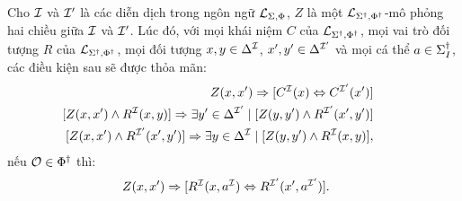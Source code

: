 \begin{Lemma}
	\label{lm:Condition}
	Cho $\mathcal{I}$ và $\mathcal{I}'$ là các diễn dịch trong ngôn ngữ $\mathcal{L}_{\Sigma,\Phi}$, $Z$ là một $\mathcal{L}_{\Sigma^\dag,\Phi^\dag}$-mô phỏng hai chiều giữa $\mathcal{I}$ và $\mathcal{I}'$. Lúc đó, với mọi khái niệm $C$ của $\mathcal{L}_{\Sigma^\dag,\Phi^\dag}$, mọi vai trò đối tượng $R$ của $\mathcal{L}_{\Sigma^\dag,\Phi^\dag}$, mọi đối tượng $x, y \in \Delta^{\mathcal{I}}$, $x', y' \in \Delta^{\mathcal{I}'}$ và mọi cá thể $a \in \Sigma^\dag_I$, các điều kiện sau sẽ được thỏa mãn:
	\begin{eqnarray}
	&&\!\!\!\!\!\!\!\!\!\!\!\!\!\!\!\!\!\!\!\!\! Z(x, x') \Rightarrow [C^\mI(x) \Leftrightarrow C^{\mI'}(x')] \label{bs:eqC3}\\
	&&\!\!\!\!\!\!\!\!\!\!\!\!\!\!\!\!\!\!\!\!\! [Z(x, x') \wedge R^\mI(x, y)] \Rightarrow \E y' \in \Delta^{\mI'} \mid [Z(y,y') \wedge R^{\mI'}(x',y')] \label{bs:eqR1}\\
	&&\!\!\!\!\!\!\!\!\!\!\!\!\!\!\!\!\!\!\!\!\! [Z(x, x') \wedge R^{\mI'}(x', y')] \Rightarrow \E y \in \Delta^\mI \mid [Z(y,y') \wedge R^\mI(x,y)], \label{bs:eqR2}
	\end{eqnarray}
	nếu $\mathcal{O} \in \Phi^\dag$ thì:
	\begin{eqnarray}
	&&\!\!\!\!\!\!\! Z(x, x') \Rightarrow [R^{\mathcal{I}}(x, a^{\mathcal{I}}) \Leftrightarrow R^{\mathcal{I}'}(x', a^{\mathcal{I}'})].\quad\label{bs:eqOR}
	\end{eqnarray}
\end{Lemma}

